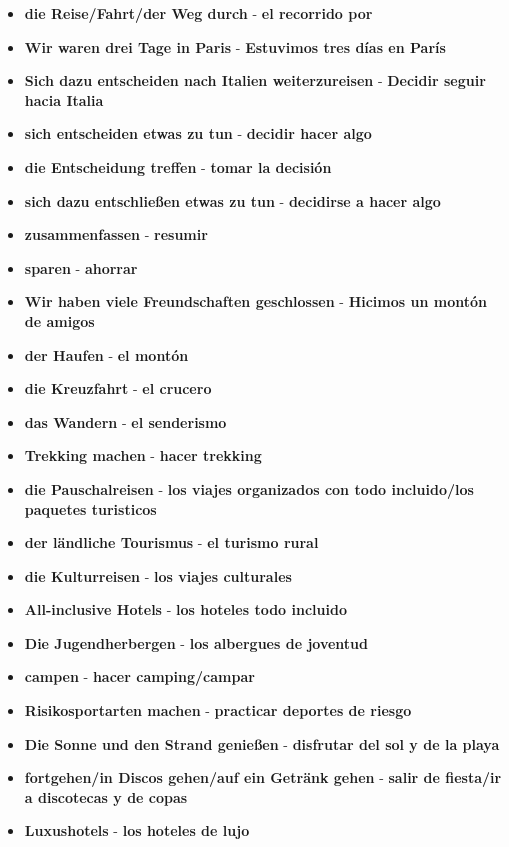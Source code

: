 \documentclass{article}
\begin{document}
\begin{multicols}{2}
\begin{itemize}
		\item{\textbf{die Reise/Fahrt/der Weg durch} - \textbf{el recorrido por}}
		\item{\textbf{Wir waren drei Tage in Paris} - \textbf{Estuvimos tres días en París}}
		\item{\textbf{Sich dazu entscheiden nach Italien weiterzureisen} - \textbf{Decidir seguir hacia Italia}}
		\item{\textbf{sich entscheiden etwas zu tun} - \textbf{decidir hacer algo}}
		\item{\textbf{die Entscheidung treffen} - \textbf{tomar la decisión}}
		\item{\textbf{sich dazu entschließen etwas zu tun} - \textbf{decidirse a hacer algo}}
		\item{\textbf{zusammenfassen} - \textbf{resumir}}
		\item{\textbf{sparen} - \textbf{ahorrar}}
		\item{\textbf{Wir haben viele Freundschaften geschlossen} - \textbf{Hicimos un montón de amigos}}
		\item{\textbf{der Haufen} - \textbf{el montón}}
		\item{\textbf{die Kreuzfahrt} - \textbf{el crucero}}
		\item{\textbf{das Wandern} - \textbf{el senderismo}}
		\item{\textbf{Trekking machen} - \textbf{hacer trekking}}
		\item{\textbf{die Pauschalreisen} - \textbf{los viajes organizados con todo incluido/los paquetes turisticos}}
		\item{\textbf{der ländliche Tourismus} - \textbf{el turismo rural}}
		\item{\textbf{die Kulturreisen} - \textbf{los viajes culturales}}
		\item{\textbf{All-inclusive Hotels} - \textbf{los hoteles todo incluido}}
		\item{\textbf{Die Jugendherbergen} - \textbf{los albergues de joventud}}
		\item{\textbf{campen} - \textbf{hacer camping/campar}}
		\item{\textbf{Risikosportarten machen} - \textbf{practicar deportes de riesgo}}
		\item{\textbf{Die Sonne und den Strand genießen} - \textbf{disfrutar del sol y de la playa}}
		\item{\textbf{fortgehen/in Discos gehen/auf ein Getränk gehen} - \textbf{salir de fiesta/ir a discotecas y de copas}}
		\item{\textbf{Luxushotels} - \textbf{los hoteles de lujo}}

\end{itemize}
\end{multicols}
\end{document}
